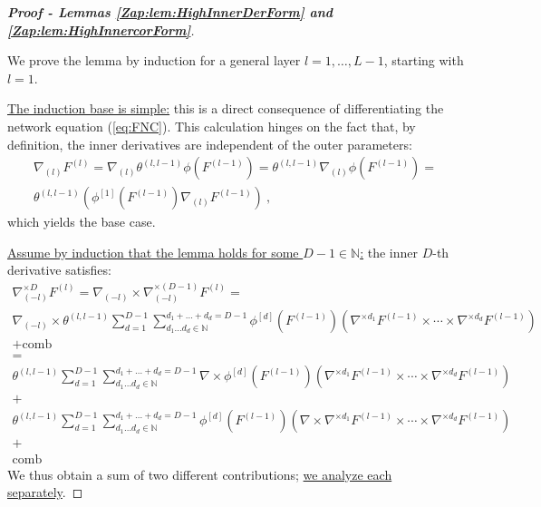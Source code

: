 \documentclass{article} %
\begin{document}
\begin{proof}[\textbf{Proof - Lemmas \ref{Zap:lem:HighInnerDerForm} and \ref{Zap:lem:HighInnercorForm}}]
\

We prove the lemma by induction for a general layer \(l=1,\ldots,L-1\), starting with \(l=1\).

\underline{The induction base is simple:} this is a direct consequence of differentiating the network equation (\ref{eq:FNC}). This calculation hinges on the fact that, by definition, the inner derivatives are independent of the outer parameters:
\begin{equation}
\begin{array}{c}
\nabla_{\left(l\right)}F^{(l)}=\nabla_{\left(l\right)}\theta^{\left(l,l-1\right)}\phi\left(F^{(l-1)}\right)=\theta^{\left(l,l-1\right)}\nabla_{\left(l\right)}\phi\left(F^{(l-1)}\right)=\\
\theta^{\left(l,l-1\right)}\left(\phi^{\left[1\right]}\left(F^{(l-1)}\right)\nabla_{\left(l\right)}F^{(l-1)}\right) \ ,
\end{array}
\end{equation}
which yields the base case.

\underline{Assume by induction that the lemma holds for some \(D-1\in\mathbb{N}\):} the inner \(D\)-th derivative satisfies:
\begin{equation}
\begin{array}{c}
\nabla_{\left(-l\right)}^{\times D}F^{(l)}=\nabla_{\left(-l\right)}\times\nabla_{\left(-l\right)}^{\times (D-1)}F^{(l)}=\\
\nabla_{\left(-l\right)}\times\theta^{\left(l,l-1\right)}\sum_{d=1}^{D-1}\sum_{d_{1}\ldots d_{d}\in\mathbb{N}}^{d_{1}+\ldots+d_{d}=D-1}\phi^{\left[d\right]}\left(F^{(l-1)}\right)\left(\nabla^{\times d_{1}}F^{(l-1)}\times\cdots\times\nabla^{\times d_{d}}F^{(l-1)}\right)\\+\text{comb}
\\
=\\
\theta^{\left(l,l-1\right)}\sum_{d=1}^{D-1}\sum_{d_{1}\ldots d_{d}\in\mathbb{N}}^{d_{1}+\ldots+d_{d}=D-1}\nabla\times\phi^{\left[d\right]}\left(F^{(l-1)}\right)\left(\nabla^{\times d_{1}}F^{(l-1)}\times\cdots\times\nabla^{\times d_{d}}F^{(l-1)}\right)\\
+\\
\theta^{\left(l,l-1\right)}\sum_{d=1}^{D-1}\sum_{d_{1}\ldots d_{d}\in\mathbb{N}}^{d_{1}+\ldots+d_{d}=D-1}\phi^{\left[d\right]}\left(F^{(l-1)}\right)\left(\nabla\times\nabla^{\times d_{1}}F^{(l-1)}\times\cdots\times\nabla^{\times d_{d}}F^{(l-1)}\right)\\
+\\
\text{comb}
\end{array}
\end{equation}
We thus obtain a sum of two different contributions; \underline{we analyze each separately}.


\end{proof}
\end{document}
